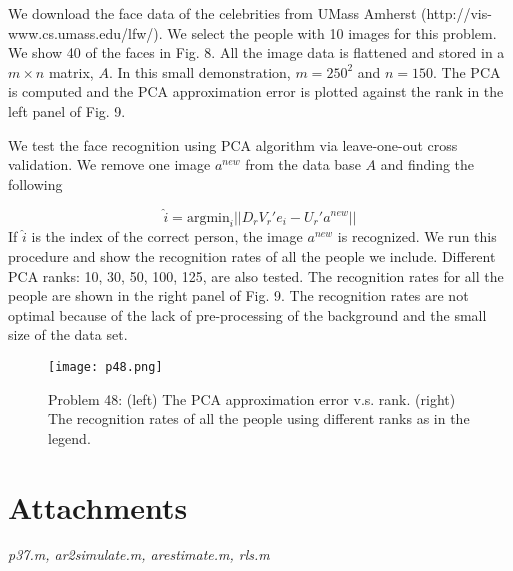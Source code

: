 \documentclass[a4paper, 11pt]{article}
\begin{document}
We download the face data of the celebrities from UMass Amherst (http://vis-www.cs.umass.edu/lfw/). We select the people with 10 images for this problem. We show 40 of the faces in Fig. 8. All the image data is flattened and stored in a $m\times n$ matrix, $A$. In this small demonstration, $m=250^2$ and $n=150$. The PCA is computed and the PCA approximation error is plotted against the rank in the left panel of Fig. 9.

We test the face recognition using PCA algorithm via leave-one-out cross validation. We remove one image $a^{new}$ from the data base $A$ and finding the following

\begin{equation}
\hat{i} = \text{argmin}_i ||D_rV_r'e_i - U_r'a^{new}||
\end{equation}
If $\hat{i}$ is the index of the correct person, the image $a^{new}$ is recognized. We run this procedure and show the recognition rates of all the people we include. Different PCA ranks: 10, 30, 50, 100, 125, are also tested. The recognition rates for all the people are shown in the right panel of Fig. 9. The recognition rates are not optimal because of the lack of pre-processing of the background and the small size of the data set. 


\begin{figure}
	\begin{center}
		\texttt{[image: p48.png]}
		\caption{Problem 48: (left) The PCA approximation error v.s. rank. (right) The recognition rates of all the people using different ranks as in the legend.  }
	\end{center}
\end{figure}



\section*{Attachments}
\textit{p37.m, ar2simulate.m, arestimate.m, rls.m}
\end{document}

